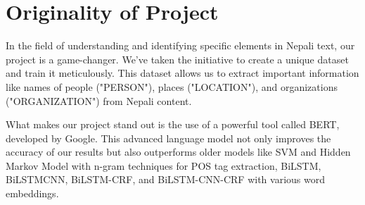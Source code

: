 


\section{Originality of Project}

 \vspace{10pt}
 
In the field of understanding and identifying specific elements in Nepali text, our project is a game-changer. We've taken the initiative to create a unique dataset and train it meticulously. This dataset allows us to extract important information like names of people ("PERSON"), places ("LOCATION"), and organizations ("ORGANIZATION") from Nepali content.

What makes our project stand out is the use of a powerful tool called BERT, developed by Google. This advanced language model not only improves the accuracy of our results but also outperforms older models like SVM and Hidden Markov Model with n-gram techniques for POS tag extraction, BiLSTM, BiLSTMCNN, BiLSTM-CRF, and BiLSTM-CNN-CRF with various word embeddings.

